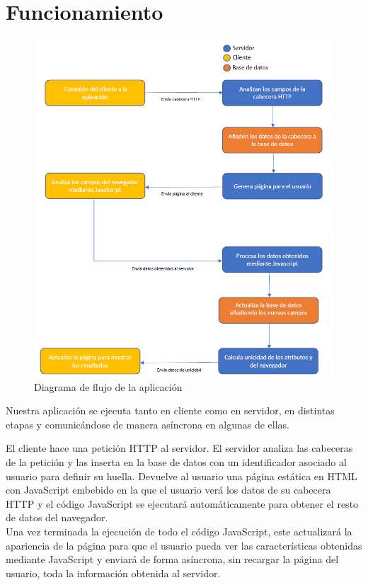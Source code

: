 \section{Funcionamiento}
\begin{figure}[tbp]
    \centering
    \includegraphics[width=1\textwidth]{Images/diagrama flujo.png}
    \caption{Diagrama de flujo de la aplicación}
    \label{fig:diagramaFlujo}
\end{figure}
Nuestra aplicación se ejecuta tanto en cliente como en servidor, en distintas etapas y comunicándose de manera asíncrona en algunas de ellas. \par
El cliente hace una petición HTTP al servidor. El servidor analiza las cabeceras de la petición y las inserta en la base de datos con un identificador asociado al usuario para definir su huella. Devuelve al usuario una página estática en HTML con JavaScript embebido en la que el usuario verá los datos de su cabecera HTTP y el código JavaScript se ejecutará automáticamente para obtener el resto de datos del navegador. \\
Una vez terminada la ejecución de todo el código JavaScript, este actualizará la apariencia de la página para que el usuario pueda ver las características obtenidas mediante JavaScript y enviará de forma asíncrona, sin recargar la página del usuario, toda la información obtenida al servidor. \\
